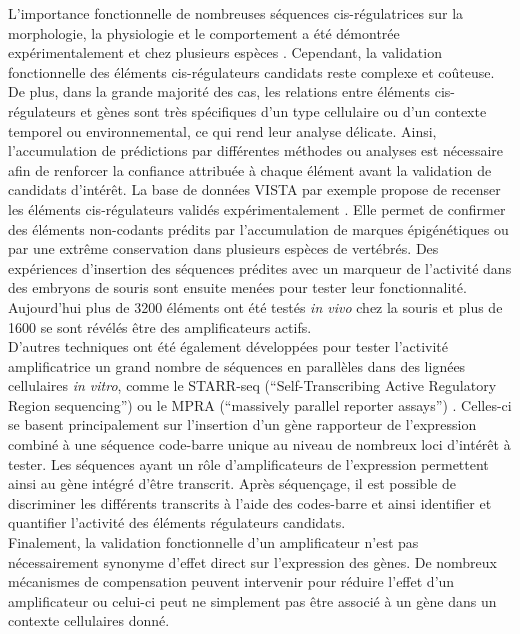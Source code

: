 L’importance fonctionnelle de nombreuses séquences \gls{cis}-régulatrices sur la morphologie, la physiologie et le comportement a été démontrée expérimentalement et chez plusieurs espèces \citep{wray_evolutionary_2007}. Cependant, la validation fonctionnelle des éléments \gls{cis}-régulateurs candidats reste complexe et coûteuse. De plus, dans la grande majorité des cas, les relations entre éléments \gls{cis}-régulateurs et gènes sont très spécifiques d’un type cellulaire ou d’un contexte temporel ou environnemental, ce qui rend leur analyse délicate. Ainsi, l’accumulation de prédictions par différentes méthodes ou analyses est nécessaire afin de renforcer la confiance attribuée à chaque élément avant la validation de candidats d’intérêt. La base de données VISTA par exemple propose de recenser les éléments \gls{cis}-régulateurs validés expérimentalement \citep{visel_vista_2007}. Elle permet de confirmer des éléments non-codants prédits par l’accumulation de marques épigénétiques ou par une extrême conservation dans plusieurs espèces de vertébrés. Des expériences d’insertion des séquences prédites avec un marqueur de l’activité dans des embryons de souris sont ensuite menées pour tester leur fonctionnalité. Aujourd’hui plus de 3200 éléments ont été testés \textit{in vivo} chez la souris et plus de 1600 se sont révélés être des \glspl{amplificateur} actifs. \\

D’autres techniques ont été également développées pour tester l'activité amplificatrice un grand nombre de séquences en parallèles dans des lignées cellulaires \textit{in vitro}, comme le STARR-seq (“Self-Transcribing Active Regulatory Region sequencing”) ou le MPRA (“massively parallel reporter assays”) \citep{arnold_quantitative_2014, inoue_decoding_2015}. Celles-ci se basent principalement sur l’insertion d’un gène rapporteur de l’expression combiné à une séquence code-barre unique au niveau de nombreux loci d’intérêt à tester. Les séquences ayant un rôle d’\glspl{amplificateur} de l’expression permettent ainsi au gène intégré d’être transcrit.  Après séquençage, il est possible de discriminer les différents transcrits à l’aide des codes-barre et ainsi identifier et quantifier l’activité des éléments régulateurs candidats. \\

Finalement, la validation fonctionnelle d’un \gls{amplificateur} n’est pas nécessairement synonyme d’effet direct sur l’expression des gènes. De nombreux mécanismes de compensation peuvent intervenir pour réduire l’effet d’un \gls{amplificateur} ou celui-ci peut ne simplement pas être associé à un gène dans un contexte cellulaires donné.

